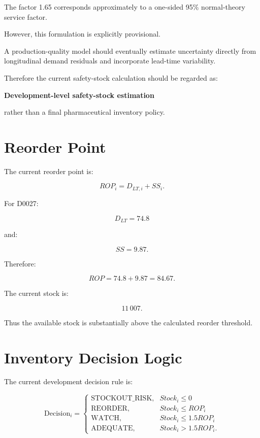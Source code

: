 \documentclass[11pt,a4paper]{article}
\begin{document}
The factor 1.65 corresponds approximately to a one-sided 95\%
normal-theory service factor.

However, this formulation is explicitly provisional.

A production-quality model should eventually estimate uncertainty
directly from longitudinal demand residuals and incorporate
lead-time variability.

Therefore the current safety-stock calculation should be regarded as:

\begin{tcolorbox}[
    colframe=goldColor,
    colback=white,
    arc=2mm
]
\centering
\textbf{Development-level safety-stock estimation}
\end{tcolorbox}

rather than a final pharmaceutical inventory policy.

\section{Reorder Point}

The current reorder point is:

\[
ROP_i
=
D_{LT,i}+SS_i.
\]

For D0027:

\[
D_{LT}=74.8
\]

and:

\[
SS=9.87.
\]

Therefore:

\[
ROP
=
74.8+9.87
=
84.67.
\]

The current stock is:

\[
11\,007.
\]

Thus the available stock is substantially above the calculated
reorder threshold.

\section{Inventory Decision Logic}

The current development decision rule is:

\[
\text{Decision}_i =
\begin{cases}
\text{STOCKOUT\_RISK}, & Stock_i \leq 0\\
\text{REORDER}, & Stock_i \leq ROP_i\\
\text{WATCH}, & Stock_i \leq 1.5ROP_i\\
\text{ADEQUATE}, & Stock_i > 1.5ROP_i.
\end{cases}
\]
\end{document}
